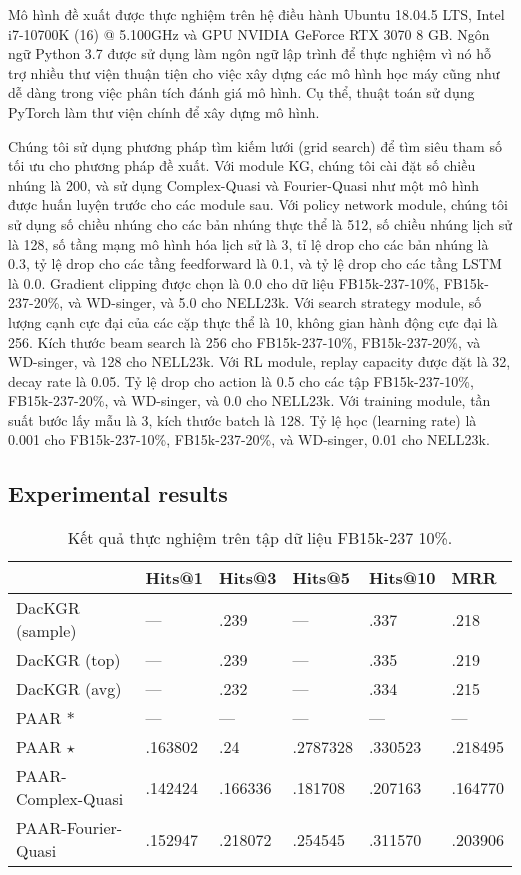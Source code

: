 Mô hình đề xuất  được thực nghiệm trên hệ điều hành Ubuntu 18.04.5 LTS, Intel i7-10700K (16) @ 5.100GHz và GPU NVIDIA GeForce RTX 3070 8 GB. Ngôn ngữ Python 3.7 được sử dụng làm ngôn ngữ lập trình để thực nghiệm vì nó hỗ trợ nhiều thư viện thuận tiện cho việc xây dựng các mô hình học máy cũng như dễ dàng trong việc phân tích đánh giá mô hình. Cụ thể, thuật toán sử dụng PyTorch làm thư viện chính để xây dựng mô hình.

Chúng tôi sử dụng phương pháp tìm kiếm lưới (grid search) để tìm siêu tham số tối ưu cho phương pháp đề xuất. Với module KG, chúng tôi cài đặt số chiều nhúng là 200, và sử dụng Complex-Quasi và Fourier-Quasi như một mô hình được huấn luyện trước cho các module sau. Với policy network module, chúng tôi sử dụng số chiều nhúng cho các bản nhúng thực thể là 512, số chiều nhúng lịch sử là 128, số tầng mạng mô hình hóa lịch sử là 3, tỉ lệ drop cho các bản nhúng là 0.3, tỷ lệ drop cho các tầng feedforward là 0.1, và tỷ lệ drop cho các tầng LSTM là 0.0. Gradient clipping được chọn là 0.0 cho dữ liệu FB15k-237-10\%, FB15k-237-20\%, và WD-singer, và 5.0 cho NELL23k. Với search strategy module, số lượng cạnh cực đại của các cặp thực thể là 10, không gian hành động cực đại là 256. Kích thước beam search là 256 cho FB15k-237-10\%, FB15k-237-20\%, và  WD-singer, và 128 cho NELL23k. Với RL module, replay capacity được đặt là 32, decay rate là 0.05. Tỷ lệ drop cho action là 0.5 cho các tập FB15k-237-10\%, FB15k-237-20\%, và  WD-singer, và 0.0 cho NELL23k. Với training module, tần suất bước lấy mẫu là 3, kích thước batch là 128. Tỷ lệ học (learning rate) là 0.001 cho FB15k-237-10\%, FB15k-237-20\%, và  WD-singer, 0.01 cho NELL23k.

\subsection{Experimental results}

\begin{center}
    \begin{table}[H]
        \centering
        \caption{Kết quả thực nghiệm trên tập dữ liệu FB15k-237 10\%.}
        \begin{tabular}{llllll}
            \toprule
         & Hits@1 & Hits@3 & Hits@5 & Hits@10 & MRR \\
            \midrule
         DacKGR (sample) & --- &  .239 & --- &  .337&  .218\\
         DacKGR (top) & --- &  .239 & --- & .335 & .219 \\
         DacKGR (avg) & --- & .232 & --- & .334 & .215 \\
         PAAR $\ast$& --- & --- & --- &  ---&  ---\\
         PAAR $\star$&  .163802&  .24&  .2787328&  .330523&  .218495\\
         PAAR-Complex-Quasi &  .142424 &  .166336&  .181708&  .207163&  .164770\\
         PAAR-Fourier-Quasi & .152947 & .218072 & .254545 & .311570 &.203906  \\
         \bottomrule
        \end{tabular}
    \end{table}
\end{center}


